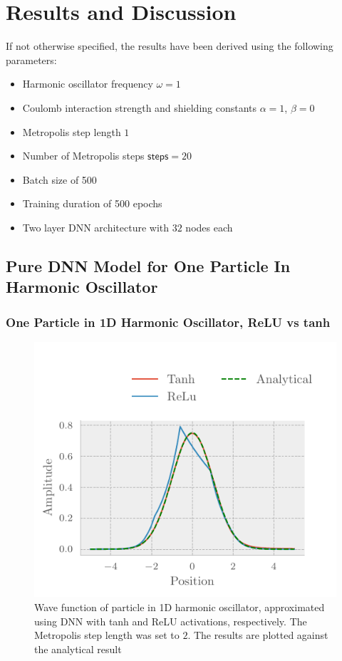 \section{Results and Discussion}\label{sec:Discussion}

If not otherwise specified, the results have been derived using the following parameters:
\begin{itemize}
	\item Harmonic oscillator frequency $\omega = 1$
	\item Coulomb interaction strength and shielding constants $\alpha = 1$, $\beta = 0$
	\item Metropolis step length $1$
	\item Number of Metropolis steps $\textsf{steps} = 20$
	\item Batch size of 500
	\item Training duration of 500 epochs
	\item Two layer DNN architecture with $32$ nodes each  
\end{itemize}


\subsection{Pure DNN Model for One Particle In Harmonic Oscillator}
\subsubsection{One Particle in 1D Harmonic Oscillator, ReLU vs tanh}

\begin{figure}[H]
	\includegraphics[]{figures/one_part_wavefunc.pdf}
	\caption{Wave function of particle in 1D harmonic oscillator, approximated using DNN with tanh and ReLU activations, respectively. The Metropolis step length was set to $2$. The results are plotted against the analytical result}
	\label{fig:one_part_func}
\end{figure}

